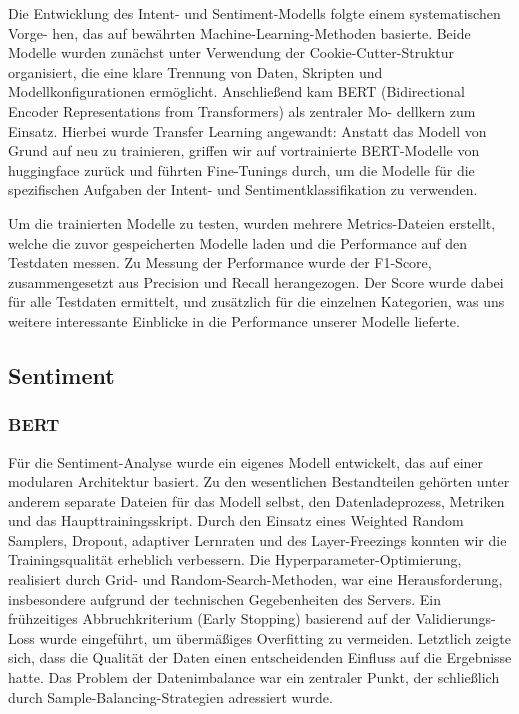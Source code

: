 Die Entwicklung des Intent- und Sentiment-Modells folgte einem systematischen Vorge- hen, 
das auf bewährten Machine-Learning-Methoden basierte. Beide Modelle wurden zunächst unter 
Verwendung der Cookie-Cutter-Struktur organisiert, die eine klare Trennung von Daten, Skripten 
und Modellkonfigurationen ermöglicht. Anschließend kam BERT (Bidirectional Encoder Representations 
from Transformers) als zentraler Mo- dellkern zum Einsatz. Hierbei wurde Transfer Learning angewandt: 
Anstatt das Modell von Grund auf neu zu trainieren, griffen wir auf vortrainierte BERT-Modelle von 
huggingface zurück und führten Fine-Tunings durch, um die Modelle für die spezifischen Aufgaben der 
Intent- und Sentimentklassifikation zu verwenden.

Um die trainierten Modelle zu testen, wurden mehrere Metrics-Dateien erstellt, welche die zuvor 
gespeicherten Modelle laden und die Performance auf den Testdaten messen. Zu Messung der Performance 
wurde der F1-Score, zusammengesetzt aus Precision und Recall herangezogen. Der Score wurde dabei für 
alle Testdaten ermittelt, und zusätzlich für die einzelnen Kategorien, was uns weitere interessante 
Einblicke in die Performance unserer Modelle lieferte.
 

\subsection{Sentiment}
\subsubsection{BERT}

Für die Sentiment-Analyse wurde ein eigenes Modell entwickelt, das auf einer modularen
Architektur basiert. Zu den wesentlichen Bestandteilen gehörten unter anderem separate
Dateien für das Modell selbst, den Datenladeprozess, Metriken und das Haupttrainingsskript.
Durch den Einsatz eines Weighted Random Samplers, Dropout, adaptiver Lernraten und des
Layer-Freezings konnten wir die Trainingsqualität erheblich verbessern. Die
Hyperparameter-Optimierung, realisiert durch Grid- und Random-Search-Methoden, war eine
Herausforderung, insbesondere aufgrund der technischen Gegebenheiten des Servers. Ein
frühzeitiges Abbruchkriterium (Early Stopping) basierend auf der Validierungs-Loss wurde
eingeführt, um übermäßiges Overfitting zu vermeiden. Letztlich zeigte sich, dass die Qualität
der Daten einen entscheidenden Einfluss auf die Ergebnisse hatte. Das Problem der Datenimbalance
war ein zentraler Punkt, der schließlich durch Sample-Balancing-Strategien adressiert wurde. 


